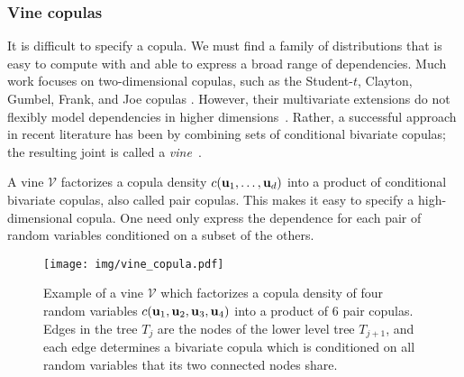 \subsubsection{Vine copulas}
\label{subsubsec:vine}

It is difficult to specify a copula.  We must find a family of
distributions that is easy to compute with and able to express a broad
range of dependencies.  Much work focuses on two-dimensional copulas,
such as the Student-$t$, Clayton, Gumbel, Frank, and Joe copulas
\citep{nelsen2006introduction}. However, their multivariate extensions
do not flexibly model dependencies in higher
dimensions~\citep{genest2009editorial}. Rather, a successful approach
in recent literature has been by combining sets of conditional
bivariate copulas; the resulting joint is called a \emph{vine}~\citep{joe1996families,kurowicka2006uncertainty}.

A vine $\mathcal{V}$ factorizes a copula density $c(\boldsymbol{\mathbf{u}}_1,\ldots,\boldsymbol{\mathbf{u}}_d)$
into a product of conditional bivariate copulas, also called pair
copulas.  This makes it easy to specify a high-dimensional copula.
One need only express the dependence for each pair of random variables
conditioned on a subset of the others.

\begin{figure}[t]
\centering
\texttt{[image: img/vine\_copula.pdf]}
\caption{Example of a vine $\mathcal{V}$ which factorizes a copula density of
four random variables $c(\boldsymbol{\mathbf{u}}_1,\boldsymbol{\mathbf{u}}_2,\boldsymbol{\mathbf{u}}_3,\boldsymbol{\mathbf{u}}_4)$ into a product
of 6 pair
copulas. Edges in the tree $T_j$ are the nodes of the lower level tree
$T_{j+1}$, and each edge determines a bivariate copula which is conditioned on
all random variables that its two connected nodes share.}
\label{fig:vine_copula}
\end{figure}

